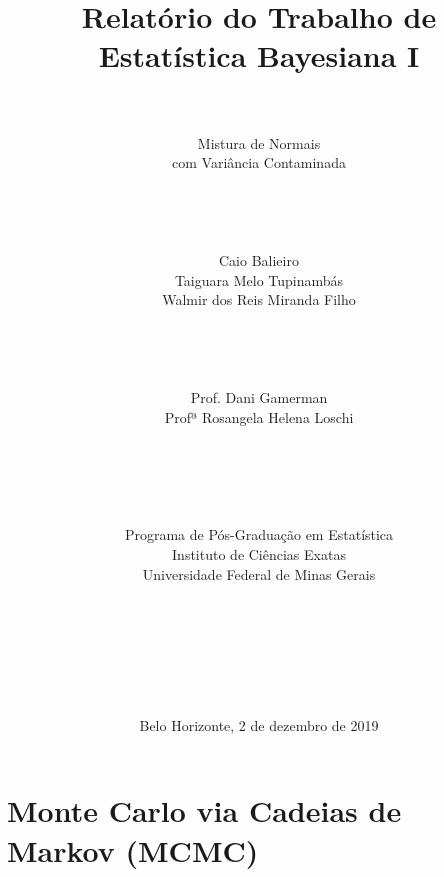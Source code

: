 \documentclass[12pt,reqno,a4paper,oneside]{article}
\begin{document}
\title{\huge Relatório do Trabalho de\\
	Estatística Bayesiana I}
\author{\\
	\\
	\huge Mistura de Normais\\
	\huge com Variância Contaminada\\
	\\
	\\
	\\
	\\
	\Large Caio Balieiro\\
	\Large Taiguara Melo Tupinambás\\
	\Large Walmir dos Reis Miranda Filho\\
	\\
	\\
	\\
	\\
	\Large Prof. Dani Gamerman\\
	\Large Profª Rosangela Helena Loschi\\
	\\
	\\
	\\
	\\
	\\
	Programa de Pós-Graduação em Estatística\\
	Instituto de Ciências Exatas\\
	Universidade Federal de Minas Gerais\\
	\\
	\\
	\\
	\\
	\\
	\\}
\date{Belo Horizonte, 2 de dezembro de 2019}
\maketitle

\newpage





\section{Monte Carlo via Cadeias de Markov (MCMC)}\label{mcmc}

\end{document}
